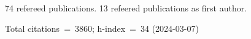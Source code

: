 74 refereed publications. 13 refeered publications as first author.

Total citations~=~3860; h-index~=~34 (2024-03-07)